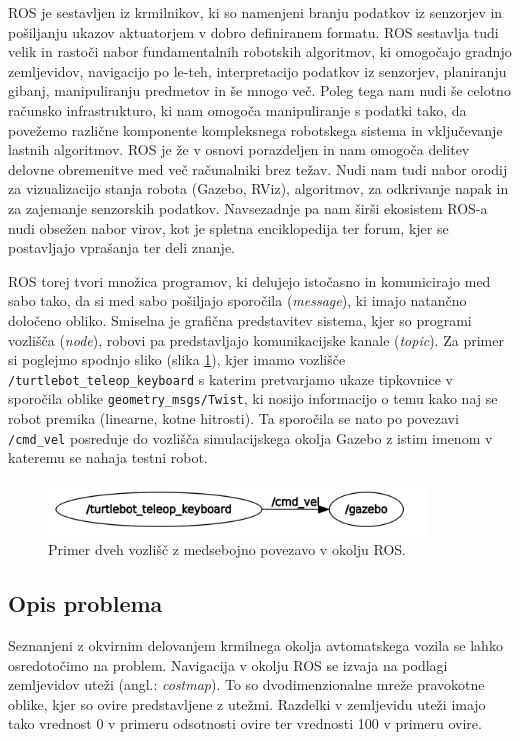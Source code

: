 \documentclass[10pt,a4paper]{article}
\begin{document}
ROS je sestavljen iz krmilnikov, ki so namenjeni branju podatkov iz senzorjev in pošiljanju ukazov aktuatorjem v dobro definiranem formatu. ROS sestavlja tudi velik in rastoči nabor fundamentalnih robotskih algoritmov, ki omogočajo gradnjo zemljevidov, navigacijo po le-teh, interpretacijo podatkov iz senzorjev, planiranju gibanj, manipuliranju predmetov in še mnogo več. Poleg tega nam nudi še celotno računsko infrastrukturo, ki nam omogoča manipuliranje s podatki tako, da povežemo različne komponente kompleksnega robotskega sistema in vključevanje lastnih algoritmov. ROS je že v osnovi porazdeljen in nam omogoča delitev delovne obremenitve med več računalniki brez težav. Nudi nam tudi nabor orodij za vizualizacijo stanja robota (Gazebo, RViz), algoritmov, za odkrivanje napak in za zajemanje senzorskih podatkov. Navsezadnje pa nam širši ekosistem ROS-a nudi obsežen nabor virov, kot je spletna enciklopedija ter forum, kjer se postavljajo vprašanja ter deli znanje.

ROS torej tvori množica programov, ki delujejo istočasno in komunicirajo med sabo tako, da si med sabo pošiljajo sporočila (\textit{message}), ki imajo natančno določeno obliko. Smiselna je grafična predstavitev sistema, kjer so programi vozlišča (\textit{node}), robovi pa predstavljajo komunikacijske kanale (\textit{topic}). Za primer si poglejmo spodnjo sliko (slika \ref{fig:sl1}), kjer imamo vozlišče \verb|/turtlebot_teleop_keyboard| s katerim pretvarjamo ukaze tipkovnice v sporočila oblike \verb|geometry_msgs/Twist|, ki nosijo informacijo o temu kako naj se robot premika (linearne, kotne hitrosti). Ta sporočila se nato po povezavi \verb|/cmd_vel| posreduje do vozlišča simulacijskega okolja Gazebo z istim imenom v kateremu se nahaja testni robot.

\begin{figure}[H]
	\centering
	\includegraphics[width=10cm]{pic/ros.png}
	\caption{Primer dveh vozlišč z medsebojno povezavo v okolju ROS.}
	\label{fig:sl1}
\end{figure}

\subsection{Opis problema}

Seznanjeni z okvirnim delovanjem krmilnega okolja avtomatskega vozila se lahko osredotočimo na problem. Navigacija v okolju ROS se izvaja na podlagi zemljevidov uteži (angl.: \textit{costmap}). To so dvodimenzionalne mreže pravokotne oblike, kjer so ovire predstavljene z utežmi. Razdelki v zemljevidu uteži imajo tako vrednost 0 v primeru odsotnosti ovire ter vrednosti 100 v primeru ovire.
\end{document}
